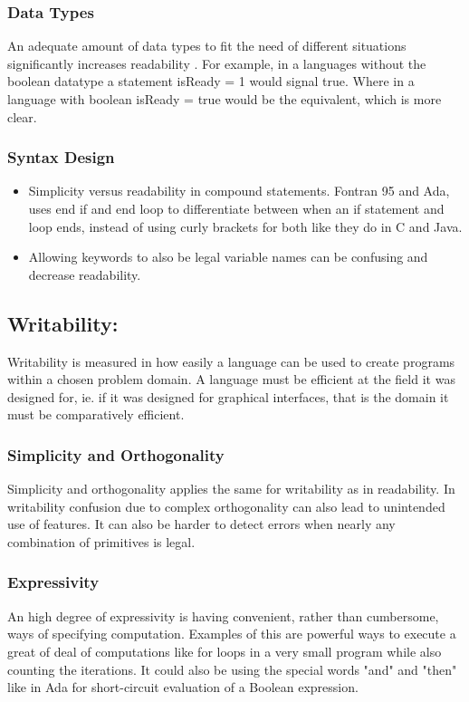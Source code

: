 \subsubsection*{Data Types}
An adequate amount of data types to fit the need of different situations significantly increases readability . For example, in a languages without the boolean datatype a statement 
isReady = 1 would signal true. Where in a language with boolean isReady = true would be the equivalent, which is more clear.

\subsubsection*{Syntax Design}
\begin{itemize}
    \item Simplicity versus readability in compound statements. Fontran 95 and Ada, uses end if and end loop to differentiate between when an if statement and loop ends, instead of using curly brackets for both like they do in C and Java.
    \item Allowing keywords to also be legal variable names can be confusing and decrease readability.
\end{itemize}

\subsection*{Writability:}
Writability is measured in how easily a language can be used to create programs within a chosen problem domain. 
A language must be efficient at the field it was designed for, ie. if it was designed for graphical interfaces, that is the domain it must be comparatively efficient.
\subsubsection*{Simplicity and Orthogonality}
Simplicity and orthogonality applies the same for writability as in readability. In writability confusion due to complex orthogonality can also lead to unintended use of features. It can also be harder to detect errors when  nearly any combination of primitives is legal.
\subsubsection*{Expressivity}
An high degree of expressivity is having convenient, rather than cumbersome, ways of specifying computation. Examples of this are powerful ways to execute a great of deal of computations like for loops in a very small program while also counting the iterations. It could also be using the special words "and" and "then" like in Ada for short-circuit evaluation of a Boolean expression.

